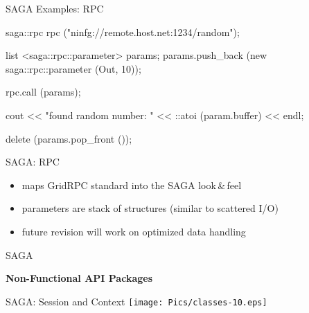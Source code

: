 \documentclass[%
  pdf,
  colorBG,
  slideColor,
  frames,
  ogf
]{prosper}
\newcommand{\B}[1]{\textbf{#1}}
\newcommand{\dn}{\vspace*{+1em}}
\newcommand{\lf}{look\,\&\,feel\xspace}
\begin{document}

 \begin{slide}{SAGA Examples: RPC}

  \begin{mycode}[label=remote procedure call]

  saga::rpc rpc ("ninfg://remote.host.net:1234/random");

  list <saga::rpc::parameter> params;
  params.push_back (new saga::rpc::parameter (Out, 10));

  rpc.call (params);

  cout << "found random number: " << ::atoi (param.buffer) << endl;

  delete (params.pop_front ());
  \end{mycode}
   
 \end{slide}


 \begin{slide}{SAGA: RPC}

 \dn 

  \begin{itemize}
   \item maps GridRPC standard into the SAGA \lf
   \item parameters are stack of structures (similar to scattered I/O)
   \item future revision will work on optimized data handling
  \end{itemize}

 \end{slide}


 \begin{slide}{SAGA}
   
   \dn\dn\dn\dn\dn 
   
   \begin{center}
   
     \B{\large Non-Functional API Packages}

   \end{center}

 \end{slide}


 \begin{slide}{SAGA: Session and Context}
   \texttt{[image: Pics/classes-10.eps]}
 \end{slide}
\end{document}
